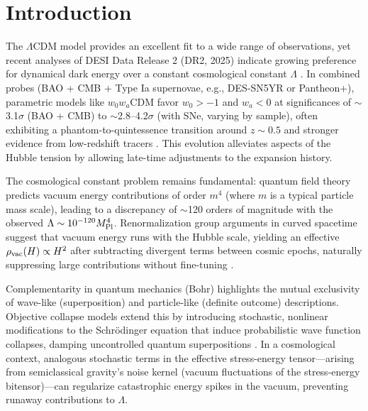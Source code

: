 \documentclass[preprint]{aastex7}
\begin{document}

\section{Introduction}
The $\Lambda$CDM model provides an excellent fit to a wide range of observations, yet recent analyses of DESI Data Release 2 (DR2, 2025) indicate growing preference for dynamical dark energy over a constant cosmological constant \( \Lambda \) \citep{DESI2025a,DESI2025b,DESI2025c}. In combined probes (BAO + CMB + Type Ia supernovae, e.g., DES-SN5YR or Pantheon+), parametric models like $w_0 w_a$CDM favor \( w_0 > -1 \) and \( w_a < 0 \) at significances of $\sim$3.1\( \sigma \) (BAO + CMB) to $\sim$2.8--4.2\( \sigma \) (with SNe, varying by sample), often exhibiting a phantom-to-quintessence transition around \( z \sim 0.5 \) and stronger evidence from low-redshift tracers \citep{DESI2025c}. This evolution alleviates aspects of the Hubble tension by allowing late-time adjustments to the expansion history.

The cosmological constant problem remains fundamental: quantum field theory predicts vacuum energy contributions of order \( m^4 \) (where \( m \) is a typical particle mass scale), leading to a discrepancy of $\sim$120 orders of magnitude with the observed \( \Lambda \sim 10^{-120} M_{\rm Pl}^4 \). Renormalization group arguments in curved spacetime suggest that vacuum energy runs with the Hubble scale, yielding an effective \( \rho_{\rm vac}(H) \propto H^2 \) after subtracting divergent terms between cosmic epochs, naturally suppressing large contributions without fine-tuning \citep{Shapiro2003,Reuter2012}.

Complementarity in quantum mechanics (Bohr) highlights the mutual exclusivity of wave-like (superposition) and particle-like (definite outcome) descriptions. Objective collapse models extend this by introducing stochastic, nonlinear modifications to the Schr\"odinger equation that induce probabilistic wave function collapses, damping uncontrolled quantum superpositions \citep{Ghirardi1986,Bassi2013}. In a cosmological context, analogous stochastic terms in the effective stress-energy tensor---arising from semiclassical gravity’s noise kernel (vacuum fluctuations of the stress-energy bitensor)---can regularize catastrophic energy spikes in the vacuum, preventing runaway contributions to \( \Lambda \).
\end{document}
